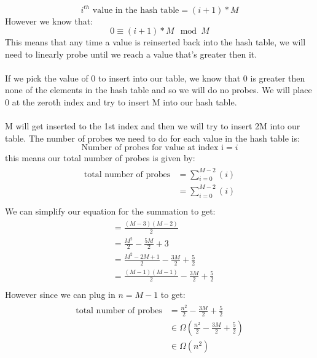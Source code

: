 \documentclass[12pt]{article}
\begin{document}
\begin{adjustwidth}{0em}{0pt}
\[ i^{th} \text{ value in the hash table} = (i+1)*M \]
However we know that:
\[ 0 \equiv (i+1)*M \mod M \]
This means that any time a value is reinserted back into the hash table, we will need to linearly probe until we reach a value that's greater then it.\\\\
If we pick the value of 0 to insert into our table, we know that 0 is greater then none of the elements in the hash table and so we will do no probes. We will place 0 at the zeroth index and try to insert M into our hash table.\\\\
M will get inserted to the 1st index and then we will try to insert 2M into our table. The number of probes we need to do for each value in the hash table is:
\[ \text{Number of probes for value at index i} = i \]
this means our total number of probes is given by:
\begin{align*}
    \begin{aligned}
      \text{total number of probes} &= \sum_{i=0}^{M-2}(i) \\
       &= \sum_{i=0}^{M-2}(i) \\
    \end{aligned}
\end{align*}
We can simplify our equation for the summation to get:
\begin{align*}  
    \begin{aligned}
       &= \frac{(M-3)(M-2)}{2} \\
       &= \frac{M^2}{2} -\frac{5M}{2} + 3\\
       &= \frac{M^2 - 2M + 1}{2} - \frac{3M}{2} + \frac{5}{2}\\
       &= \frac{(M-1)(M-1)}{2} - \frac{3M}{2} + \frac{5}{2}\\
    \end{aligned}
\end{align*}
However since we can plug in $n = M - 1$ to get:
\begin{align*}
    \begin{aligned}
      \text{total number of probes} &= \frac{n^2}{2} - \frac{3M}{2} + \frac{5}{2}\\
      &\in \Omega(\frac{n^2}{2} - \frac{3M}{2} + \frac{5}{2})\\
      &\in \Omega(n^2)\\
    \end{aligned}
\end{align*}


\end{adjustwidth} 
\end{document}
